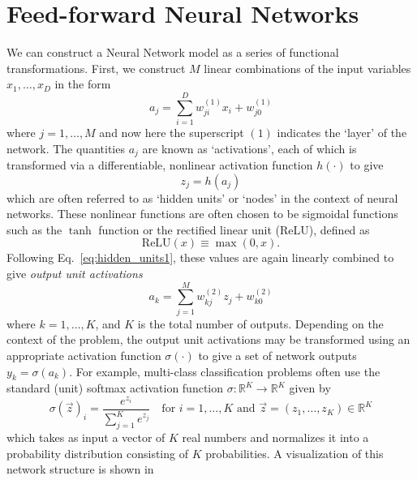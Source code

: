 \documentclass[../main.tex]{subfiles}
\begin{document}
\section{Feed-forward Neural Networks}
We can construct a Neural Network model as a series of functional
transformations.
%
First, we construct $M$ linear combinations of the input variables $x_{1},
\ldots, x_{D}$ in the form
%
\begin{equation}
  a_{j} = \sum_{i=1}^{D} w_{ji}^{(1)} x_{i} + w_{j0}^{(1)}
  \label{eq:activations1}
\end{equation}
%
where $j = 1, \ldots, M$ and now here the superscript $(1)$ indicates the
`layer' of the network.
%
The quantities $a_j$ are known as `activations', each of which is transformed
via a differentiable, nonlinear activation function $h(\cdot)$ to give
%
\begin{equation}
  z_{j} = h(a_{j})
  \label{eq:hidden_units1}
\end{equation}
%
which are often referred to as `hidden units' or `nodes' in the context of
neural networks.
%
These nonlinear functions are often chosen to be sigmoidal functions such as
the $\tanh$ function or the rectified linear unit (ReLU), defined as
%
\begin{equation}
  \mathrm{ReLU}(x) \equiv \max{(0, x)}.
\end{equation}
%
Following Eq.~\ref{eq:hidden_units1}, these values are again linearly combined
to give \emph{output unit activations}
%
\begin{equation}
  a_{k} = \sum_{j=1}^{M} w_{kj}^{(2)} z_{j} + w_{k0}^{(2)}
\end{equation}
%
where $k = 1, \ldots, K$, and $K$ is the total number of outputs. Depending on
the context of the problem, the output unit activations may be transformed
using an appropriate activation function $\sigma(\cdot)$ to give a set of
network outputs $y_{k} = \sigma(a_{k})$.
%
For example, multi-class classification problems often use the standard (unit)
softmax activation function $\sigma: \mathbb{R}^{K} \rightarrow \mathbb{R}^{K}$
given by
%
\begin{equation}
  \sigma{(\vec{z})}_{i} = \frac{e^{z_{i}}}{\sum_{j=1}^{K} e^{z_{j}}}\quad \mathrm{for}\,\, i = 1, \ldots, K\,\,
  \mathrm{and} \,\, \vec{z} = {(z_1, \ldots, z_{K})} \in \mathbb{R}^{K}
\end{equation}
%
which takes as input a vector of $K$ real numbers and normalizes it into a
probability distribution consisting of $K$ probabilities.
%
A visualization of this network structure is shown in
\end{document}
